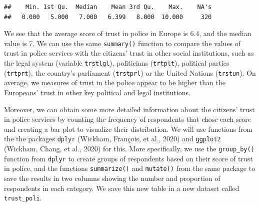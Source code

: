 \documentclass[
]{article}
\newenvironment{Shaded}{\begin{snugshade}}{\end{snugshade}}
\newcommand{\CommentTok}[1]{\textcolor[rgb]{0.56,0.35,0.01}{\textit{#1}}}
\newcommand{\DataTypeTok}[1]{\textcolor[rgb]{0.13,0.29,0.53}{#1}}
\newcommand{\KeywordTok}[1]{\textcolor[rgb]{0.13,0.29,0.53}{\textbf{#1}}}
\newcommand{\NormalTok}[1]{#1}
\newcommand{\OperatorTok}[1]{\textcolor[rgb]{0.81,0.36,0.00}{\textbf{#1}}}
\newcommand{\StringTok}[1]{\textcolor[rgb]{0.31,0.60,0.02}{#1}}
\begin{document}
\begin{Shaded}
\end{Shaded}

\begin{verbatim}
##    Min. 1st Qu.  Median    Mean 3rd Qu.    Max.    NA's 
##   0.000   5.000   7.000   6.399   8.000  10.000     320
\end{verbatim}

We see that the average score of trust in police in Europe is 6.4, and
the median value is 7. We can use the same \texttt{summary()} function
to compare the values of trust in police services with the citizens'
trust in other social institutions, such as the legal system (variable
\texttt{trstlgl}), politicians (\texttt{trtplt}), political parties
(\texttt{trtprt}), the country's parliament (\texttt{trstprl}) or the
United Nations (\texttt{trstun}). On average, we measures of trust in
the police appear to be higher than the Europeans' trust in other key
political and legal institutions.

Moreover, we can obtain some more detailed information about the
citizens' trust in police services by counting the frequency of
respondents that chose each score and creating a bar plot to visualize
their distribution. We will use functions from the the packages
\texttt{dplyr} (Wickham, François, et al., 2020) and \texttt{ggplot2}
(Wickham, Chang, et al., 2020) for this. More specifically, we use the
\texttt{group\_by()} function from \texttt{dplyr} to create groups of
respondents based on their score of trust in police, and the functions
\texttt{summarize()} and \texttt{mutate()} from the same package to save
the results in two columns showing the number and proportion of
respondents in each category. We save this new table in a new dataset
called \texttt{trust\_poli}.

\begin{Shaded}
\end{Shaded}
\end{document}
